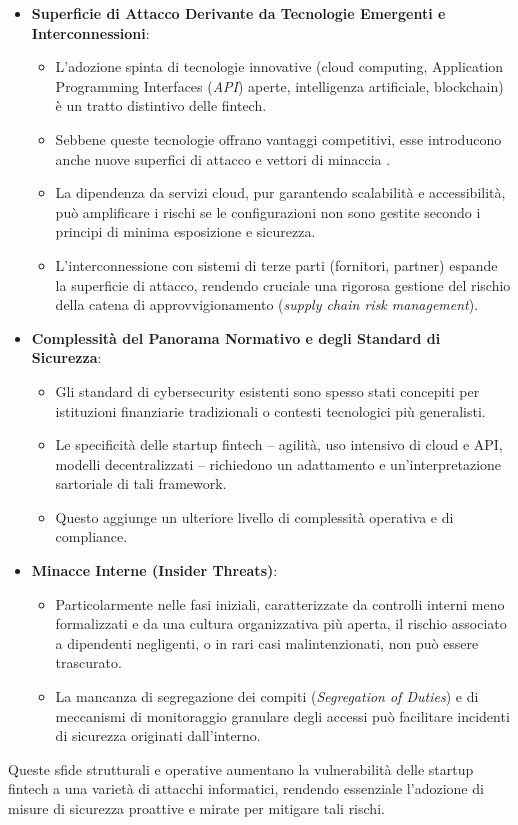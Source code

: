 \begin{itemize}
    \item \textbf{Superficie di Attacco Derivante da Tecnologie Emergenti e Interconnessioni}:
    \begin{itemize}
        \item L'adozione spinta di tecnologie innovative
        (cloud computing, Application Programming Interfaces (\textit{API}) aperte, intelligenza artificiale, blockchain)\allowbreak{} %
        è un tratto distintivo delle fintech.

        \item Sebbene queste tecnologie offrano vantaggi competitivi, esse introducono anche nuove superfici di attacco e vettori di minaccia \cite{fintechChallenges}.
        \item La dipendenza da servizi cloud, pur garantendo scalabilità e accessibilità, può amplificare i rischi se le configurazioni non sono gestite secondo i principi di minima esposizione e sicurezza.
        \item L'interconnessione con sistemi di terze parti (fornitori, partner) espande la superficie di attacco, rendendo cruciale una rigorosa gestione del rischio della catena di approvvigionamento (\textit{supply chain risk management}).
    \end{itemize}
    
    \item \textbf{Complessità del Panorama Normativo e degli Standard di Sicurezza}:
    \begin{itemize}
        \item Gli standard di cybersecurity esistenti sono spesso stati concepiti per istituzioni finanziarie tradizionali o contesti tecnologici più generalisti.
        \item Le specificità delle startup fintech – agilità, uso intensivo di cloud e API, modelli decentralizzati – richiedono un adattamento e un'interpretazione sartoriale di tali framework.
        \item Questo aggiunge un ulteriore livello di complessità operativa e di compliance.
    \end{itemize}
    
    \item \textbf{Minacce Interne (Insider Threats)}:
    \begin{itemize}
        \item Particolarmente nelle fasi iniziali, caratterizzate da controlli interni meno formalizzati e da una cultura organizzativa più aperta, il rischio associato a dipendenti negligenti, o in rari casi malintenzionati, non può essere trascurato.
        \item La mancanza di segregazione dei compiti (\textit{Segregation of Duties}) e di meccanismi di monitoraggio granulare degli accessi può facilitare incidenti di sicurezza originati dall'interno.
    \end{itemize}
\end{itemize}
Queste sfide strutturali e operative aumentano la vulnerabilità delle startup fintech a una varietà di attacchi informatici, rendendo essenziale l'adozione di misure di sicurezza proattive e mirate per mitigare tali rischi.

